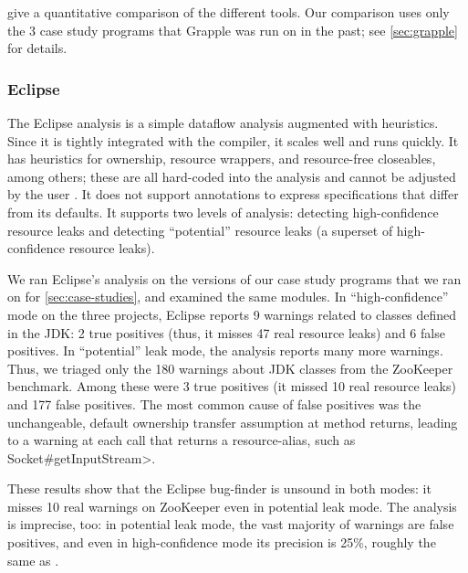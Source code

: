  give a quantitative comparison of the
different tools.  Our comparison uses only the 3 case study programs that Grapple was
run on in the past; see \cref{sec:grapple} for details.




\subsubsection{Eclipse}
\label{sec:eclipse}

The Eclipse analysis is a simple dataflow analysis
augmented with heuristics. Since it is tightly integrated with
the compiler, it scales well and runs quickly. It has
heuristics for ownership, resource wrappers, and resource-free
closeables, among others; these are all hard-coded into the analysis and cannot
be adjusted by the user . It does not support annotations to express
specifications that differ from its defaults.
It supports two levels of analysis: detecting high-confidence resource
leaks and detecting ``potential'' resource
leaks (a superset of high-confidence resource leaks).

We ran Eclipse's analysis on the versions of our case study programs
that we ran \tool on for \cref{sec:case-studies}, and examined
the same modules.
In ``high-confidence'' mode on the three projects, Eclipse reports 9
warnings related to classes defined in the JDK:
2 true positives (thus, it misses 47 real resource leaks) and 6
false positives.
In ``potential'' leak mode, the analysis reports many more warnings.
Thus, we triaged only the 180
warnings about JDK classes from the ZooKeeper benchmark.
Among these were 3 true positives (it missed 10 real resource leaks) and 177 false
positives.
The most common cause of false
positives was the unchangeable, default ownership transfer assumption
at method returns, leading to a warning at each call that returns a resource-alias, such as
\<Socket\#getInputStream>.

These results show that the Eclipse bug-finder is unsound in both
modes: it misses 10 real warnings on ZooKeeper even in potential leak mode.
The analysis is imprecise, too: in potential leak mode,
the vast majority of warnings are false positives, and even in high-confidence
mode its precision is 25\%, roughly the same as \tool.


